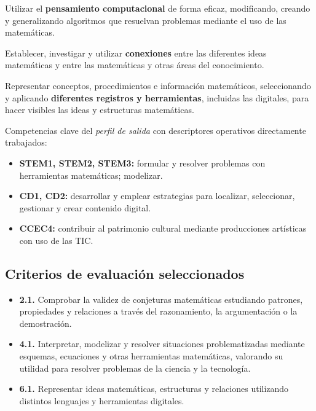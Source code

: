 \documentclass[12pt,a4paper]{scrartcl}
\newcommand{\acc}[1]{\textcolor{accent}{\textbf{#1}}}
\begin{document}
\begin{competencia}
Utilizar el \acc{pensamiento computacional} de forma eficaz, modificando, creando y generalizando algoritmos que resuelvan problemas mediante el uso de las matemáticas.
\end{competencia}

\begin{competencia}
Establecer, investigar y utilizar \acc{conexiones} entre las diferentes ideas matemáticas y entre las matemáticas y otras áreas del conocimiento.
\end{competencia}

\begin{competencia}
Representar conceptos, procedimientos e información matemáticos, seleccionando y aplicando \acc{diferentes registros y herramientas}, incluidas las digitales, para hacer visibles las ideas y estructuras matemáticas.
\end{competencia}

\medskip
Competencias clave del \emph{perfil de salida} con descriptores operativos directamente trabajados:

\begin{itemize}[leftmargin=1.3em,itemsep=0.15em,topsep=0.3em]
  \item \acc{STEM1, STEM2, STEM3:} formular y resolver problemas con herramientas matemáticas; modelizar.
  \item \acc{CD1, CD2:} desarrollar y emplear estrategias para localizar, seleccionar, gestionar y crear contenido digital.
  \item \acc{CCEC4:} contribuir al patrimonio cultural mediante producciones artísticas con uso de las TIC.
\end{itemize}

\subsection{Criterios de evaluación seleccionados}

\begin{itemize}[leftmargin=1.3em,itemsep=0.15em,topsep=0.3em]
  \item \textbf{2.1.} Comprobar la validez de conjeturas matemáticas estudiando patrones, propiedades y relaciones a través del razonamiento, la argumentación o la demostración.
  \item \textbf{4.1.} Interpretar, modelizar y resolver situaciones problematizadas mediante esquemas, ecuaciones y otras herramientas matemáticas, valorando su utilidad para resolver problemas de la ciencia y la tecnología.
  \item \textbf{6.1.} Representar ideas matemáticas, estructuras y relaciones utilizando distintos lenguajes y herramientas digitales.
\end{itemize}
\end{document}
